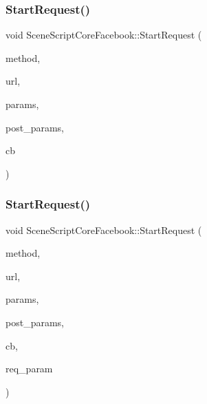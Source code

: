 \hypertarget{class_scene_script_core_facebook_ae8605309cc071c90e36899799100a36a}{}\label{class_scene_script_core_facebook_ae8605309cc071c90e36899799100a36a} 
\subsubsection{\texorpdfstring{Start\+Request()}{StartRequest()}\hspace{0.1cm}{\footnotesize\ttfamily [1/2]}}
{\footnotesize\ttfamily void Scene\+Script\+Core\+Facebook\+::\+Start\+Request (\begin{DoxyParamCaption}\item[{string \&in}]{method,  }\item[{string \&in}]{url,  }\item[{string \&in}]{params,  }\item[{string \&in}]{post\+\_\+params,  }\item[{Callback1\+I1S @}]{cb }\end{DoxyParamCaption})}

\hypertarget{class_scene_script_core_facebook_a39176c97d731e3f7992aaa57e80a9be1}{}\label{class_scene_script_core_facebook_a39176c97d731e3f7992aaa57e80a9be1} 
\subsubsection{\texorpdfstring{Start\+Request()}{StartRequest()}\hspace{0.1cm}{\footnotesize\ttfamily [2/2]}}
{\footnotesize\ttfamily void Scene\+Script\+Core\+Facebook\+::\+Start\+Request (\begin{DoxyParamCaption}\item[{string \&in}]{method,  }\item[{string \&in}]{url,  }\item[{string \&in}]{params,  }\item[{string \&in}]{post\+\_\+params,  }\item[{Callback1\+I2S @}]{cb,  }\item[{string \&in}]{req\+\_\+param }\end{DoxyParamCaption})}

